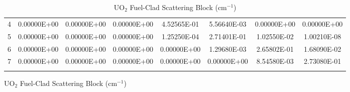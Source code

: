 \begin{figure}
\begin{table}[H]
\begin{subtable}[h]{1.0\textwidth}
{\begin{tabular}{*8c}
4 & 0.00000E+00 & 0.00000E+00 & 0.00000E+00 & 4.52565E-01 & 5.56640E-03 & 0.00000E+00 & 0.00000E+00 \\
5 & 0.00000E+00 & 0.00000E+00 & 0.00000E+00 & 1.25250E-04 & 2.71401E-01 & 1.02550E-02 & 1.00210E-08 \\
6 & 0.00000E+00 & 0.00000E+00 & 0.00000E+00 & 0.00000E+00 & 1.29680E-03 & 2.65802E-01 & 1.68090E-02 \\
7 & 0.00000E+00 & 0.00000E+00 & 0.00000E+00 & 0.00000E+00 & 0.00000E+00 & 8.54580E-03 & 2.73080E-01 \\
        \bottomrule
        & & & & & & & 
    \end{tabular}}
        \caption{UO$_{2}$ Fuel-Clad Scattering Block (cm$^{-1}$)}
  \end{subtable}
\end{table}
\end{figure}

